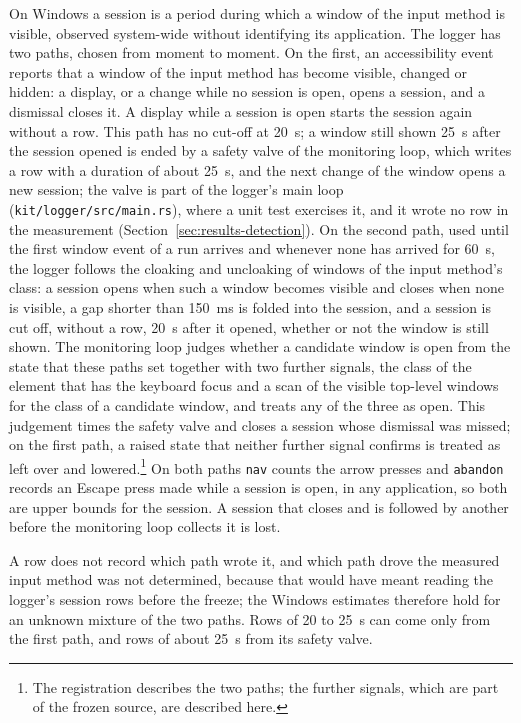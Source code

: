 On Windows a session is a period during which a window of the input method is visible, observed system-wide without
identifying its application. The logger has two paths, chosen from moment to moment. On the first, an accessibility
event reports that a window of the input method has become visible, changed or hidden: a display, or a change while no
session is open, opens a session, and a dismissal closes it. A display while a session is open starts the session
again without a row. This path has no cut-off at 20~s; a window still shown 25~s after the session opened is ended by a
safety valve of the monitoring loop, which writes a row with a duration of about 25~s, and the next change of the
window opens a new session; the valve is part of the logger's main loop (\texttt{kit/logger/src/main.rs}), where a
unit test exercises it, and it wrote no row in the measurement (Section~\ref{sec:results-detection}). On the second path, used until the first window event of a run arrives and whenever none
has arrived for 60~s, the logger follows the cloaking and uncloaking of windows of the input method's class: a session
opens when such a window becomes visible and closes when none is visible, a gap shorter than 150~ms is folded into the
session, and a session is cut off, without a row, 20~s after it opened, whether or not the window is still shown. The monitoring loop
judges whether a candidate window is open from the state that these paths set together with two further signals, the
class of the element that has the keyboard focus and a scan of the visible top-level windows for the class of a
candidate window, and treats any of the three as open. This judgement times the safety valve and closes a session
whose dismissal was missed; on the first path, a raised state that neither further signal confirms is treated as left
over and lowered.\footnote{The registration describes the two paths; the further signals, which are part of the frozen
source, are described here.} On both paths
\texttt{nav} counts the arrow presses and \texttt{abandon} records an Escape press made while a session is open, in any
application, so both are upper bounds for the session. A session that closes and is followed by another before the
monitoring loop collects it is lost.

A row does not record which path wrote it, and which path drove the measured input method was not determined, because
that would have meant reading the logger's session rows before the freeze; the Windows estimates therefore hold for an
unknown mixture of the two paths. Rows of 20 to 25~s can come only from the first path, and rows of about 25~s from its
safety valve.

